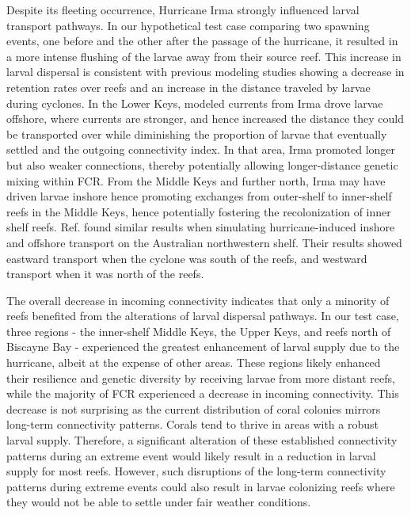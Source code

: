 \documentclass[fleqn,10pt]{wlscirep}
\newcommand{\modif}[1]{{#1}}
\begin{document}
Despite its fleeting occurrence, Hurricane Irma strongly influenced larval transport pathways. In our hypothetical test case comparing two spawning events, one before and the other after the passage of the hurricane, it resulted in a more intense flushing of the larvae away from their source reef. This increase in larval dispersal is consistent with \modif{previous modeling studies showing a decrease in retention rates over reefs \cite{grimaldi2022hydrodynamic} and an increase in the distance traveled by larvae \citep{radford2014cyclones} during cyclones}. In the Lower Keys, \modif{modeled currents from} Irma drove larvae offshore, where currents are stronger, and hence increased the distance they could be transported over while diminishing the proportion of larvae that eventually settled and the outgoing connectivity index. In that area, Irma promoted longer but also weaker connections, thereby \modif{potentially} allowing longer-distance genetic mixing within FCR. From the Middle Keys and further north, Irma \modif{may have driven} larvae inshore hence promoting exchanges from outer-shelf to inner-shelf reefs in the Middle Keys, hence potentially fostering the recolonization of inner shelf reefs. \modif{Ref. \citep{radford2014cyclones} found similar results when simulating hurricane-induced inshore and offshore transport on the Australian northwestern shelf. Their results showed eastward transport when the cyclone was south of the reefs, and westward transport when it was north of the reefs.}

The overall decrease in incoming connectivity indicates that only a minority of reefs benefited from the alterations of larval dispersal pathways. In our test case, three regions - the inner-shelf Middle Keys, the Upper Keys, and reefs north of Biscayne Bay - experienced the greatest enhancement of larval supply due to the hurricane, albeit at the expense of other areas. These regions likely enhanced their resilience and genetic diversity by receiving larvae from more distant reefs, while the majority of FCR experienced a decrease in incoming connectivity. This \modif{decrease} is not surprising as the current distribution of coral \modif{colonies} mirrors long-term connectivity patterns. \modif{Corals} tend to thrive in areas with a robust larval supply. Therefore, \modif{a significant alteration of these established connectivity patterns during an extreme event} would likely result in a reduction in larval supply for most reefs. \modif{However, such disruptions of the long-term connectivity patterns during extreme events could also result in larvae colonizing reefs where they would not be able to settle under fair weather conditions}.
\end{document}
